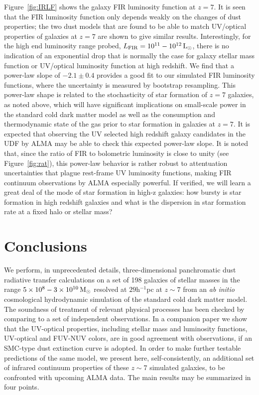 Figure~\ref{fig:IRLF} shows the galaxy FIR luminosity function at $z=7$.
It is seen that the FIR luminosity function only depends weakly on the changes of dust properties;
the two dust models that are found to be able to match UV/optical properties of galaxies at $z=7$
are shown to give similar results.
Interestingly, for the high end luminosity range probed, $L_{\rm FIR}=10^{11}-10^{12}{\rm\,L_\odot}$,
there is no indication of an exponential drop that is normally the case for galaxy stellar mass function 
or UV/optical luminosity function at high redshift.
We find that a power-law slope of $-2.1\pm0.4$ provides a good fit to our simulated FIR luminosity functions,
where the uncertainty is measured by bootstrap resampling.
This power-law shape is related to the stochasticity of star formation of $z=7$ galaxies,
as noted above, which will have significant implications on small-scale power in the standard cold dark matter model
as well as the consumption and thermodynamic state of the gas prior to star formation in galaxies at $z=7$.
It is expected that observing the UV selected high redshift galaxy candidates in the UDF
by ALMA may be able to check this expected power-law slope.
It is noted that, since the ratio of FIR to bolometric luminosity is close to unity (see Figure~\ref{fig:rat}),
this power-law behavior is rather robust to 
attentuation uncertainties that plague rest-frame UV luminosity functions,
making FIR continuum observations by ALMA especially powerful.
If verified, we will learn a great deal of the mode of star formation in high-z galaxies:
how bursty is star formation in high redshift galaxies
and what is the dispersion in star formation rate at a fixed halo or stellar mass?
















\section{Conclusions}

We perform, in unprecedented details, three-dimensional panchromatic dust radiative transfer calculations
on a set of 198 galaxies of stellar masses in the range $5\times 10^8-3\times10^{10}{\rm\,M_\odot}$ resolved at $29$h$^{-1}$pc at $z\sim 7$ from 
an {\it ab initio} cosmological hydrodynamic simulation of the standard cold dark matter model.
The soundness of treatment of relevant physical processes has been checked by comparing to a set of independent observations.
In a companion paper \citep{2013Kimm} we show that 
the UV-optical properties, including stellar mass and luminosity functions, UV-optical and FUV-NUV colors,
are in good agreement with observations, if an SMC-type dust extinction curve is adopted.
In order to make further testable predictions of the same model,
we present here, self-consistently, an additional set of infrared continuum properties of these $z\sim 7$ simulated galaxies,
to be confronted with upcoming ALMA data.
The main results may be summarized in four points.

